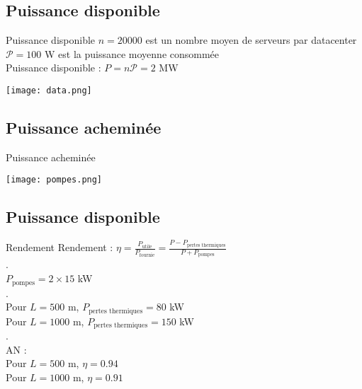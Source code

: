 \documentclass[hyperref={pdfpagelabels=false}]{beamer}
\begin{document}
\subsection*{Puissance disponible}\label{icu1}
\begin{frame}{Puissance disponible}
$n = 20 000$ est un nombre moyen de serveurs par datacenter \\
$\mathcal{P} = 100$ W est la puissance moyenne consommée \\
Puissance disponible : $ P =  n\mathcal{P} = 2$ MW \\
\begin{center}
\texttt{[image: data.png]} 
\end{center}


\end{frame}

\subsection*{Puissance acheminée}\label{icu2}
\begin{frame}{Puissance acheminée}
\begin{center}
\texttt{[image: pompes.png]} 
\end{center}
\end{frame}

\subsection*{Puissance disponible}\label{icu3}
\begin{frame}{Rendement}
Rendement : $\eta = \frac{P_{\text{utile}}}{P_{\text{fournie}}} = \frac{P - P_{\text{pertes thermiques}}}{P + P_{\text{pompes}}}$ \\
{\color{white}.} \\
$P_{\text{pompes}} =  2 \times 15$ kW \\
{\color{white}.} \\
Pour $L = 500$ m, $P_{\text{pertes thermiques}} = 80$ kW \\
Pour $L = 1000$ m, $P_{\text{pertes thermiques}} = 150$ kW \\
{\color{white}.} \\
AN : \\
Pour $L = 500$ m, $\eta= 0.94$ \\
Pour $L = 1000$ m, $\eta = 0.91$ \\
\end{frame}
\end{document}
